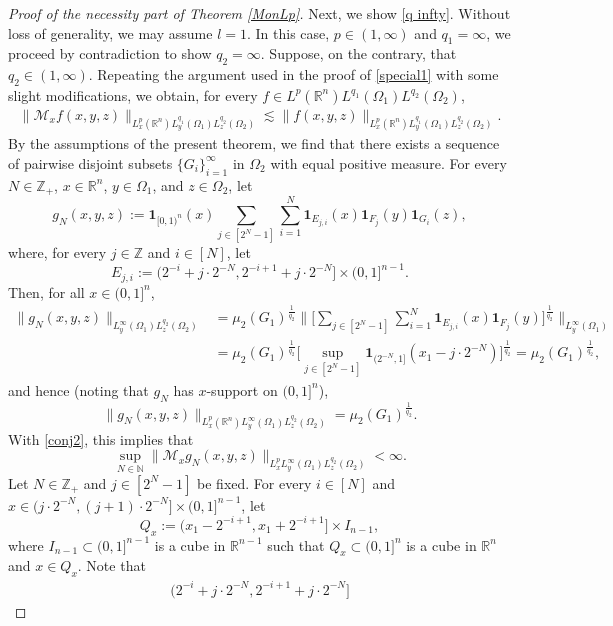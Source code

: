 \documentclass[11pt, reqno]{amsart}
\theoremstyle{definition}
\theoremstyle{remark}
\numberwithin{equation}{section}
\newcommand{\Z}{\mathbb Z}
\newcommand{\one}{\mathbf{1}}
\begin{document}
\begin{proof}[Proof of the necessity part of Theorem \ref{MonLp}]
Next, we show \eqref{q infty}.
Without loss of generality, we may assume $l=1$.
In this case, $p\in(1,\infty)$ and $q_1=\infty$,
we proceed by contradiction to show $q_2=\infty$.
Suppose, on the contrary, that $q_2\in(1,\infty)$.
Repeating the argument used in the proof of \eqref{special1}
with some slight modifications, we obtain,
for every $f\in L^p(\mathbb R^n)L^{q_1}(\Omega_1)L^{q_2}(\Omega_2)$,
\begin{align} \label{conj2}
\|\mathcal M_x f(x,y,z)\|_{L^p_x(\mathbb R^n)L^{q_1}_y(\Omega_1)L^{q_2}_z(\Omega_2)}
\lesssim\|f(x,y,z)\|_{L^p_x(\mathbb R^n)L^{q_1}_y(\Omega_1)L^{q_2}_z(\Omega_2)}.
\end{align}
By the assumptions of the present theorem,
we find that there exists a sequence
of pairwise disjoint subsets $\{G_i\}_{i=1}^\infty$ in $\Omega_2$
with equal positive measure.
For every $N\in\Z_+$, $x\in\mathbb R^n$,
$y\in\Omega_1$, and $z\in\Omega_2$, let
$$
g_N(x,y,z):=\mathbf{1}_{[0,1)^n}(x)
\sum_{j\in[2^N-1]}\sum_{i=1}^N
\mathbf{1}_{E_{j,i}}(x)
\mathbf{1}_{F_j}(y)\mathbf{1}_{G_i}(z),
$$
where, for every $j\in\mathbb Z$ and
$i\in[N]$, let
$$
E_{j,i}:=\Big(2^{-i}+j\cdot2^{-N},2^{-i+1}+j\cdot 2^{-N}\Big]
\times (0,1]^{n-1}.
$$
Then, for all $x\in (0,1]^n$,
\begin{align*}
\|g_N(x,y,z)\|_{L^\infty_y(\Omega_1)L^{q_2}_z(\Omega_2)}
&=\mu_2(G_1)^{\frac1{q_2}}
\Bigg\|\Bigg[\sum_{j\in[2^N-1]}\sum_{i=1}^N
\mathbf{1}_{E_{j,i}}(x)\mathbf{1}_{F_j}(y)\Bigg]^{\frac1{q_2}}
\Bigg\|_{L^\infty_y(\Omega_1)}\\
&=\mu_2(G_1)^{\frac1{q_2}}
\Bigg[\sup_{j\in[2^N-1]}
\one_{(2^{-N},1]}(x_1-j\cdot 2^{-N})
\Bigg]^{\frac1{q_2}} 
=\mu_2(G_1)^{\frac1{q_2}},
\end{align*}
and hence (noting that $g_N$ has $x$-support on $(0,1]^n$),
$$
\|g_N(x,y,z)\|_{L^p_x(\mathbb R^n)L^\infty_y(\Omega_1)L^{q_2}_z(\Omega_2)}
=\mu_2(G_1)^{\frac1{q_2}}.
$$
With \eqref{conj2}, this implies that
\begin{equation}\label{<infty3}
\sup_{N\in\mathbb N} \|\mathcal M_xg_N(x,y,z)\|_{L^p_xL^{\infty}_y(\Omega_1)L^{q_2}_z(\Omega_2)}<\infty.
\end{equation}
Let $N\in\Z_+$ and $j\in [2^N-1]$ be fixed.
For every $i\in[N]$ and $x\in(j\cdot 2^{-N},(j+1)\cdot 2^{-N}]\times (0,1]^{n-1}$, let
$$
Q_x:= (x_1-2^{-i+1}, x_1+2^{-i+1}] \times I_{n-1},
$$
where $I_{n-1}\subset(0,1]^{n-1}$ is a cube in $\mathbb R^{n-1}$
such that $Q_x\subset(0,1]^n$ is a cube in $\mathbb R^n$ and $x\in Q_x$.
Note that
\begin{align*}
\Big(2^{-i}+j\cdot2^{-N},2^{-i+1}+j\cdot 2^{-N}\Big]

\end{align*}
\end{proof}
\end{document}
